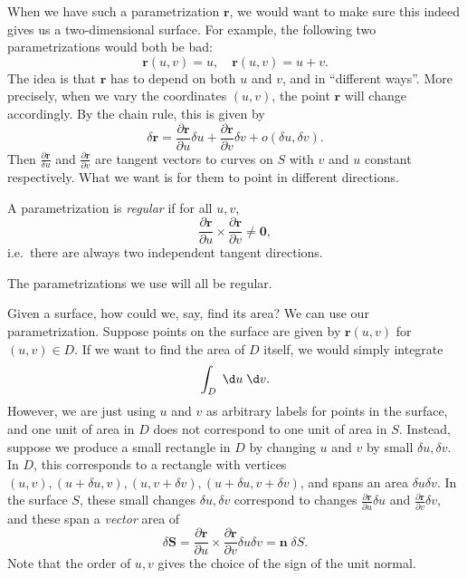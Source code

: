 \documentclass[a4paper]{article}
\begin{document}
When we have such a parametrization $\mathbf{r}$, we would want to make sure this indeed gives us a two-dimensional surface. For example, the following two parametrizations would both be bad:
\[
  \mathbf{r}(u, v) = u,\quad \mathbf{r}(u, v) = u + v.
\]
The idea is that $\mathbf{r}$ has to depend on both $u$ and $v$, and in ``different ways''. More precisely, when we vary the coordinates $(u, v)$, the point $\mathbf{r}$ will change accordingly. By the chain rule, this is given by
\[
  \delta \mathbf{r} = \frac{\partial \mathbf{r}}{\partial u}\delta u + \frac{\partial \mathbf{r}}{\partial v}\delta v + o(\delta u, \delta v).
\]
Then $\frac{\partial \mathbf{r}}{\delta u}$ and $\frac{\partial \mathbf{r}}{\partial v}$ are tangent vectors to curves on $S$ with $v$ and $u$ constant respectively. What we want is for them to point in different directions.

\begin{defi}
  A parametrization is \emph{regular} if for all $u, v$,
  \[
    \frac{\partial \mathbf{r}}{\partial u}\times \frac{\partial \mathbf{r}}{\partial v} \not = \mathbf{0},
  \]
  i.e.\ there are always two independent tangent directions.
\end{defi}
The parametrizations we use will all be regular.

Given a surface, how could we, say, find its area? We can use our parametrization. Suppose points on the surface are given by $\mathbf{r}(u, v)$ for $(u, v) \in D$. If we want to find the area of $D$ itself, we would simply integrate
\[
  \int_D \;\d u\;\d v.
\]
However, we are just using $u$ and $v$ as arbitrary labels for points in the surface, and one unit of area in $D$ does not correspond to one unit of area in $S$. Instead, suppose we produce a small rectangle in $D$ by changing $u$ and $v$ by small $\delta u, \delta v$. In $D$, this corresponds to a rectangle with vertices $(u, v), (u + \delta u, v), (u, v + \delta v), (u + \delta u, v + \delta v)$, and spans an area $\delta u \delta v$. In the surface $S$, these small changes $\delta u, \delta v$ correspond to changes $\frac{\partial \mathbf{r}}{\partial u} \delta u$ and $\frac{\partial \mathbf{r}}{\partial v} \delta v$, and these span a \emph{vector} area of
\[
  \delta \mathbf{S} = \frac{\partial \mathbf{r}}{\partial u}\times \frac{\partial \mathbf{r}}{\partial v} \delta u \delta v= \mathbf{n}\;\delta S.
\]
Note that the order of $u, v$ gives the choice of the sign of the unit normal.
\end{document}
